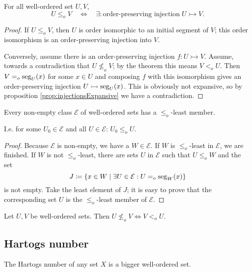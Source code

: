 \begin{corollary}
For all well-ordered set $U,V$,
\[ U \leq_o V \quad \iff \quad \exists: \text{order-preserving injection} \;U\rightarrowtail V. \]
\end{corollary}
\begin{proof}
If $U \leq_o V$, then $U$ is order isomorphic to an initial segment of $V$; this order isomorphism is an order-preserving injection into $V$.

Conversely, assume there is an order-preserving injection $f:U\rightarrowtail V$. Assume, towards a contradiction that $U \nleq_o V$; by the theorem this means $V <_o U$. Then $V=_o \operatorname{seg}_U(x)$ for some $x\in U$ and composing $f$ with this isomorphism gives an order-preserving injection $U\rightarrowtail \operatorname{seg}_U(x)$. This is obviously not expansive, so by proposition \ref{prop:injectionsExpansive} we have a contradiction.
\end{proof}
\begin{corollary}\label{corollary:wellfoundednessOfWosetComparison}
Every non-empty class $\mathcal{E}$ of well-ordered sets has a $\leq_o$-least member.
\end{corollary}
I.e. for some $U_0\in \mathcal{E}$ and all $U\in \mathcal{E}$: $U_0\leq_o U$.
\begin{proof}
Because $\mathcal{E}$ is non-empty, we have a $W\in\mathcal{E}$. If $W$ is $\leq_o$-least in $\mathcal{E}$, we are finished. If $W$ is not $\leq_o$-least, there are sets $U$ in $\mathcal{E}$ such that $U\leq_o W$ and the set
\[ J \coloneqq \{x\in W\;|\;\exists U\in\mathcal{E}: U =_o \operatorname{seg}_W(x)\} \]
is not empty. Take the least element of $J$; it is easy to prove that the corresponding set $U$ is the $\leq_o$-least member of $\mathcal{E}$.
\end{proof}
\begin{corollary}
Let $U,V$ be well-ordered sets. Then $U\nleq_o V \iff V <_o U$.
\end{corollary}

\subsection{Hartogs number}
The Hartogs number of any set $X$ is a bigger well-ordered set.

